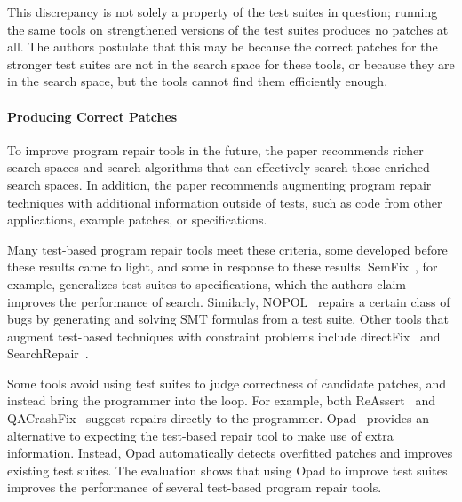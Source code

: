 This discrepancy is not solely a property of the test suites in question;
running the same tools on strengthened versions of the test suites produces no patches at all.
The authors postulate that this may be because the correct patches for the stronger test suites are not in the
search space for these tools, or because they are in the search space, but the tools
cannot find them efficiently enough. 

\paragraph{Producing Correct Patches}
To improve program repair tools in the future, the paper recommends richer search 
spaces and search algorithms that can effectively search those enriched search spaces. 
In addition, the paper recommends augmenting program repair techniques with additional information outside of
tests, such as code from other applications, example patches, or specifications.

Many test-based program repair tools meet these criteria, some developed before these results came to light,
and some in response to these results. 
SemFix~\cite{nguyen2013semfix}, for example,
generalizes test suites to specifications, which the authors claim improves the performance of search.
Similarly, NOPOL~\cite{Xuan:2017:NAR:3071893.3071964} repairs a certain class of bugs by generating and solving SMT formulas from a test suite.
Other tools that augment test-based techniques with constraint problems include
directFix~\cite{Mechtaev:2015:DLS:2818754.2818811} and SearchRepair~\cite{Ke:2015:RPS:2916135.2916260}. %

Some tools avoid using test suites to judge correctness of candidate patches, and instead
bring the programmer into the loop. For example, both ReAssert~\cite{daniel2009reassert}
and QACrashFix~\cite{gao2015fixing} suggest repairs directly to the programmer. %
Opad~\cite{Yang:2017:BTC:3106237.3106274} provides an alternative to expecting the test-based repair tool
to make use of extra information. Instead, Opad automatically detects overfitted patches and improves existing test suites.
The evaluation shows that using Opad to improve test suites improves the performance of several test-based program repair tools. %

